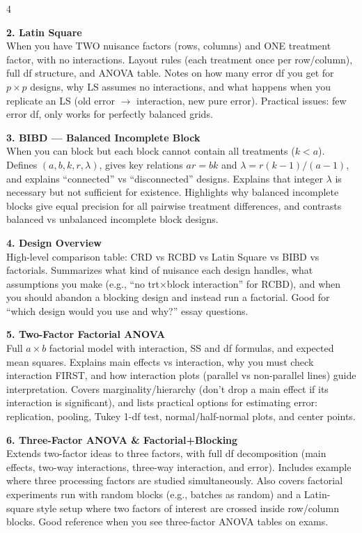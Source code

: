 \documentclass[7pt,letterpaper,landscape]{extarticle}
\begin{document}
\begin{multicols*}{4}
{\textbf{2. Latin Square}\\
When you have TWO nuisance factors (rows, columns) and ONE treatment factor, with no interactions. Layout rules (each treatment once per row/column), full df structure, and ANOVA table. Notes on how many error df you get for $p\times p$ designs, why LS assumes no interactions, and what happens when you replicate an LS (old error $\to$ interaction, new pure error). Practical issues: few error df, only works for perfectly balanced grids.

\textbf{3. BIBD — Balanced Incomplete Block}\\
When you can block but each block cannot contain all treatments ($k<a$). Defines $(a,b,k,r,\lambda)$, gives key relations $ar=bk$ and $\lambda = r(k-1)/(a-1)$, and explains “connected” vs “disconnected” designs. Explains that integer $\lambda$ is necessary but not sufficient for existence. Highlights why balanced incomplete blocks give equal precision for all pairwise treatment differences, and contrasts balanced vs unbalanced incomplete block designs.

\textbf{4. Design Overview}\\
High-level comparison table: CRD vs RCBD vs Latin Square vs BIBD vs factorials. Summarizes what kind of nuisance each design handles, what assumptions you make (e.g., “no trt×block interaction” for RCBD), and when you should abandon a blocking design and instead run a factorial. Good for “which design would you use and why?” essay questions.

\textbf{5. Two-Factor Factorial ANOVA}\\
Full $a\times b$ factorial model with interaction, SS and df formulas, and expected mean squares. Explains main effects vs interaction, why you must check interaction FIRST, and how interaction plots (parallel vs non-parallel lines) guide interpretation. Covers marginality/hierarchy (don’t drop a main effect if its interaction is significant), and lists practical options for estimating error: replication, pooling, Tukey 1-df test, normal/half-normal plots, and center points.

\textbf{6. Three-Factor ANOVA \& Factorial+Blocking}\\
Extends two-factor ideas to three factors, with full df decomposition (main effects, two-way interactions, three-way interaction, and error). Includes example where three processing factors are studied simultaneously. Also covers factorial experiments run with random blocks (e.g., batches as random) and a Latin-square style setup where two factors of interest are crossed inside row/column blocks. Good reference when you see three-factor ANOVA tables on exams.

}
\end{multicols*}
\end{document}

